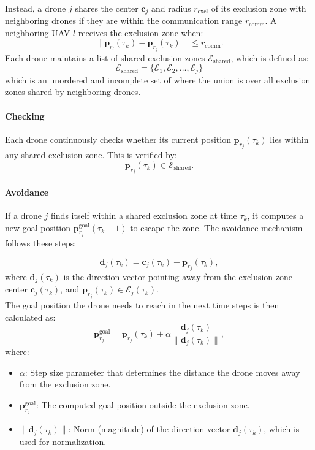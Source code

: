 \noindent
\\
Instead, a drone \( j \) shares the center \( \mathbf{c}_j \) and radius 
\( r_{\text{excl}} \) of its exclusion zone with neighboring drones 
if they are within the communication range \( r_{\text{comm}} \). 
A neighboring UAV \( l \) receives the exclusion zone when:
\[
\|\mathbf{p}_{r_l}(\tau_k) - \mathbf{p}_{r_j}(\tau_k)\| \leq r_{\text{comm}}.
\]
Each drone maintains a list of shared exclusion zones 
\( \mathcal{E}_\text{shared} \), which is defined as:
\[
\mathcal{E}_\text{shared} = \{\mathcal{E}_1, \mathcal{E}_2, \dots, \mathcal{E}_j\}
\]
which is an unordered and incomplete set of 
where the union is over all exclusion zones shared by neighboring drones.

\paragraph{Checking}
Each drone continuously checks whether its current position 
\( \mathbf{p}_{r_j}(\tau_k) \) lies within any shared exclusion zone. 
This is verified by:
\[
\mathbf{p}_{r_j}(\tau_k) \in \mathcal{E}_\text{shared}.
\]

\paragraph{Avoidance}
If a drone \( j \) finds itself within a shared exclusion zone at time \( \tau_k \), 
it computes a new goal position \( \mathbf{p}_{r_j}^{\text{goal}}(\tau_k + 1) \) 
to escape the zone. The avoidance mechanism follows these steps:

\[
\mathbf{d}_j(\tau_k) = \mathbf{c}_j(\tau_k) - \mathbf{p}_{r_j}(\tau_k),
\]
where \( \mathbf{d}_j(\tau_k) \) is the direction vector pointing away 
from the exclusion zone center \( \mathbf{c}_j(\tau_k) \), and 
\( \mathbf{p}_{r_j}(\tau_k) \in \mathcal{E}_j(\tau_k) \).
\noindent\\
The goal position the drone needs to reach in the next time steps is then calculated as:
\[
\mathbf{p}_{r_j}^{\text{goal}} = \mathbf{p}_{r_j}(\tau_k) 
+ \alpha \frac{\mathbf{d}_j(\tau_k)}{\|\mathbf{d}_j(\tau_k)\|},
\]
where:
\begin{itemize}
    \item \( \alpha \): Step size parameter that determines 
    the distance the drone moves away from the exclusion zone.
    \item \( \mathbf{p}_{r_j}^{\text{goal}} \): The computed 
    goal position outside the exclusion zone.
    \item \( \|\mathbf{d}_j(\tau_k)\| \): Norm (magnitude) of the direction 
    vector \( \mathbf{d}_j(\tau_k) \), which is used for normalization.
\end{itemize}

